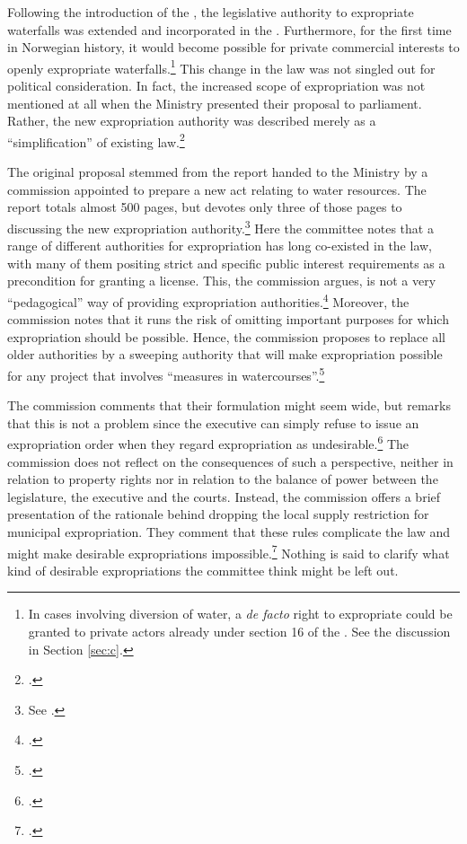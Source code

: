 Following the introduction of the \cite{wra00}, the legislative authority to expropriate waterfalls  was extended and incorporated in the \cite{ea59}. Furthermore, for the first time in Norwegian history, it would become possible for private commercial interests to openly expropriate waterfalls.\footnote{In cases involving diversion of water, a {\it de facto} right to expropriate could be granted to private actors already under section 16 of the \cite{wra17}. See the discussion in Section \ref{sec:c}.} This change in the law was not singled out for political consideration. In fact, the increased scope of expropriation was not mentioned at all when the Ministry presented their proposal to parliament. Rather, the new expropriation authority was described merely as a ``simplification'' of existing law.\footcite[223-225]{otprp39}

The original proposal stemmed from the report handed to the Ministry by a commission appointed to prepare a new act relating to water resources. The report totals almost 500 pages, but devotes only three of those pages to discussing the new expropriation authority.\footnote{See \cite[235-237]{nou094}.} Here the committee notes that a range of different authorities for expropriation has long co-existed in the law, with many of them positing strict and specific public interest requirements as a precondition for granting a license. This, the commission argues, is not a very ``pedagogical'' way of providing expropriation authorities.\footcite[235]{nou94} Moreover, the commission notes that it runs the risk of omitting important purposes for which expropriation should be possible. Hence, the commission proposes to replace all older authorities by a sweeping authority that will make expropriation possible for any project that involves ``measures in watercourses''.\footcite[235-236]{nou94}


The commission comments that their formulation might seem wide, but remarks that this is not a problem since the executive can simply refuse to issue an expropriation order when they regard expropriation as undesirable.\footcite[235]{nou94} The commission does not reflect on the consequences of such a perspective, neither in relation to property rights nor in relation to the balance of power between the legislature, the executive and the courts. Instead, the commission offers a brief presentation of the rationale behind dropping the local supply restriction for municipal expropriation. They comment that these rules complicate the law and might make desirable expropriations impossible.\footcite[235]{nou94} Nothing is said to clarify what kind of desirable expropriations the committee think might be left out. 

